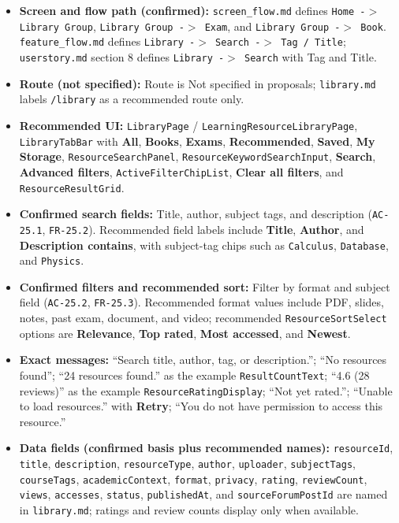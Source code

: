 \documentclass[12pt]{article}
\begin{document}
\begin{itemize}
\item \textbf{Screen and flow path (confirmed):} \texttt{screen\_flow.md} defines \texttt{Home -$>$ Library Group}, \texttt{Library Group -$>$ Exam}, and \texttt{Library Group -$>$ Book}. \texttt{feature\_flow.md} defines \texttt{Library -$>$ Search -$>$ Tag / Title}; \texttt{userstory.md} section 8 defines \texttt{Library -$>$ Search} with Tag and Title.
\item \textbf{Route (not specified):} Route is Not specified in proposals; \texttt{library.md} labels \texttt{/library} as a recommended route only.
\item \textbf{Recommended UI:} \texttt{LibraryPage} / \texttt{LearningResourceLibraryPage}, \texttt{LibraryTabBar} with \textbf{All}, \textbf{Books}, \textbf{Exams}, \textbf{Recommended}, \textbf{Saved}, \textbf{My Storage}, \texttt{ResourceSearchPanel}, \texttt{ResourceKeywordSearchInput}, \textbf{Search}, \textbf{Advanced filters}, \texttt{ActiveFilterChipList}, \textbf{Clear all filters}, and \texttt{ResourceResultGrid}.
\item \textbf{Confirmed search fields:} Title, author, subject tags, and description (\texttt{AC-25.1}, \texttt{FR-25.2}). Recommended field labels include \textbf{Title}, \textbf{Author}, and \textbf{Description contains}, with subject-tag chips such as \texttt{Calculus}, \texttt{Database}, and \texttt{Physics}.
\item \textbf{Confirmed filters and recommended sort:} Filter by format and subject field (\texttt{AC-25.2}, \texttt{FR-25.3}). Recommended format values include PDF, slides, notes, past exam, document, and video; recommended \texttt{ResourceSortSelect} options are \textbf{Relevance}, \textbf{Top rated}, \textbf{Most accessed}, and \textbf{Newest}.
\item \textbf{Exact messages:} “Search title, author, tag, or description.”; “No resources found”; “24 resources found.” as the example \texttt{ResultCountText}; “4.6 (28 reviews)” as the example \texttt{ResourceRatingDisplay}; “Not yet rated.”; “Unable to load resources.” with \textbf{Retry}; “You do not have permission to access this resource.”
\item \textbf{Data fields (confirmed basis plus recommended names):} \texttt{resourceId}, \texttt{title}, \texttt{description}, \texttt{resourceType}, \texttt{author}, \texttt{uploader}, \texttt{subjectTags}, \texttt{courseTags}, \texttt{academicContext}, \texttt{format}, \texttt{privacy}, \texttt{rating}, \texttt{reviewCount}, \texttt{views}, \texttt{accesses}, \texttt{status}, \texttt{publishedAt}, and \texttt{sourceForumPostId} are named in \texttt{library.md}; ratings and review counts display only when available.

\end{itemize}
\end{document}
